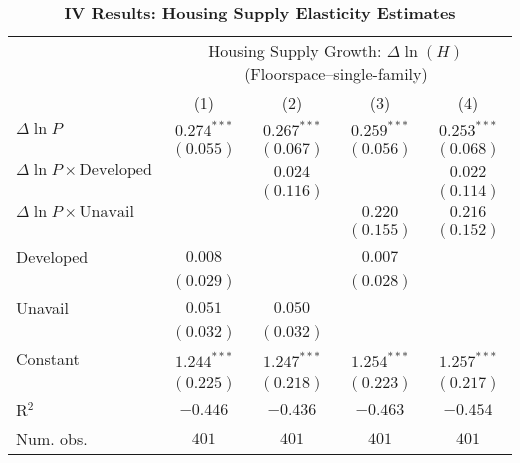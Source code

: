 
\begin{table}[H]
\caption{\textbf{IV Results: Housing Supply Elasticity Estimates}}
\begin{center}
\begin{scriptsize}
\begin{threeparttable}
\begin{tabular}{l c c c c}
\toprule
 & \multicolumn{4}{c}{Housing Supply Growth: $\Delta\ln(H)$ (Floorspace--single-family)} \\
\cmidrule(lr){2-5}
 & (1) & (2) & (3) & (4) \\
\midrule
$\Delta\ln P$                         & $0.274^{***}$ & $0.267^{***}$ & $0.259^{***}$ & $0.253^{***}$ \\
                                      & $(0.055)$     & $(0.067)$     & $(0.056)$     & $(0.068)$     \\
$\Delta\ln P\times{\text{Developed}}$ &               & $0.024$       &               & $0.022$       \\
                                      &               & $(0.116)$     &               & $(0.114)$     \\
$\Delta\ln P\times{\text{Unavail}}$   &               &               & $0.220$       & $0.216$       \\
                                      &               &               & $(0.155)$     & $(0.152)$     \\
Developed                             & $0.008$       &               & $0.007$       &               \\
                                      & $(0.029)$     &               & $(0.028)$     &               \\
Unavail                               & $0.051$       & $0.050$       &               &               \\
                                      & $(0.032)$     & $(0.032)$     &               &               \\
Constant                              & $1.244^{***}$ & $1.247^{***}$ & $1.254^{***}$ & $1.257^{***}$ \\
                                      & $(0.225)$     & $(0.218)$     & $(0.223)$     & $(0.217)$     \\
\midrule
R$^2$                                 & $-0.446$      & $-0.436$      & $-0.463$      & $-0.454$      \\
Num. obs.                             & $401$         & $401$         & $401$         & $401$         \\

\end{tabular}
\end{threeparttable}
\end{scriptsize}
\end{center}
\end{table}
